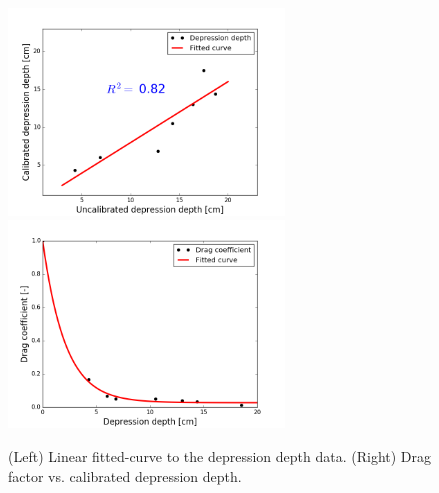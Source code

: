 \documentclass[review,11pt]{elsarticle}
\begin{document}
\begin{figure}[!h]
\centering
\includegraphics[width=6.cm, height=5.5cm]{./figures/fittedcurve-dd-1.png}
\includegraphics[width=6.cm, height=5.5cm]{./figures/fittedcurve-manning.png}
\caption{ (Left) Linear fitted-curve to the depression depth data. (Right) Drag factor vs. calibrated depression depth.}
\label{curvefit-dd-manning}
\end{figure}
\end{document}
